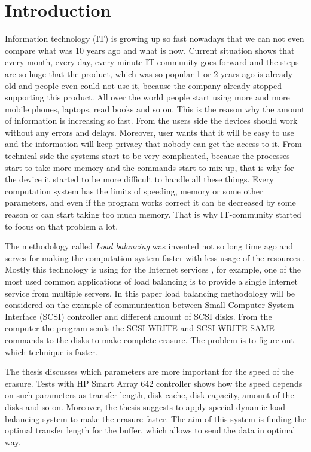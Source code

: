 \chapter{Introduction}
\label{chap1:title}

Information technology (IT) is growing up so fast nowadays that we can not even compare what was 10 years ago and what is now. Current situation shows that every month, every day, every minute IT-community goes forward and the steps are so huge that the product, which was so popular 1 or 2 years ago is already old and people even could not use it, because the company already stopped supporting this product. All over the world people start using more and more mobile phones, laptops, read books and so on. This is the reason why the amount of information is increasing so fast. From the users side the devices should work without any errors and delays. Moreover, user wants that it will be easy to use and the information will keep privacy that nobody can get the access to it. From technical side the systems start to be very complicated, because the processes start to take more memory and the commands start to mix up, that is why for the device it started to be more difficult to handle all these things. Every computation system has the limits of speeding, memory or some other parameters, and even if the program works correct it can be decreased by some reason or can start taking too much memory. That is why IT-community started to focus on that problem a lot. 

The methodology called \emph{Load balancing} was invented not so long time ago and serves for making the computation system faster with less usage of the resources \cite{load_bal}. Mostly this technology is using for the Internet services \cite{dyn_bal_web}, for example, one of the most used common applications of load balancing is to provide a single Internet service from multiple servers. In this paper load balancing methodology will be considered on the example of communication between Small Computer System Interface (SCSI) controller and different amount of SCSI disks. From the computer the program sends the SCSI WRITE and SCSI WRITE SAME commands to the disks to make complete erasure. The problem is to figure out which technique is faster.

The thesis discusses which parameters are more important for the speed of the erasure. Tests with HP Smart Array 642 controller shows how the speed depends on such parameters as transfer length, disk cache, disk capacity, amount of the disks and so on. Moreover, the thesis suggests to apply special dynamic load balancing system to make the erasure faster. The aim of this system is finding the optimal transfer length for the buffer, which allows to send the data in optimal way. 

